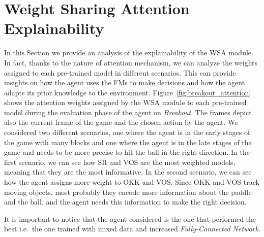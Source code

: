 \section{Weight Sharing Attention Explainability}\label{sec:explainability}
In this Section we provide an analysis of the explainability of the WSA module.
In fact, thanks to the nature of attention mechanism, we can analyze the weights assigned to each pre-trained model in different scenarios.
This can provide insights on how the agent uses the FMs to make decisions and how the agent adapts its prior knowledge to the environment.
Figure~\ref{fig:breakout_attention} shows the attention weights assigned by the WSA module to each pre-trained model during the evaluation phase of the agent on \textit{Breakout}.
The frames depict also the current frame of the game and the chosen action by the agent.
We considered two different scenarios, one where the agent is in the early stages of the game with many blocks and one where the agent is in the late stages of the game and needs to be more precise to hit the ball in the right direction.
In the first scenario, we can see how SR and VOS are the most weighted models, meaning that they are the most informative.
In the second scenario, we can see how the agent assigns more weight to OKK and VOS.
Since OKK and VOS track moving objects, most probably they encode more information about the paddle and the ball, and the agent needs this information to make the right decision.

It is important to notice that the agent considered is the one that performed the best i.e.\ the one trained with mixed data and increased \textit{Fully-Connected Network}.


